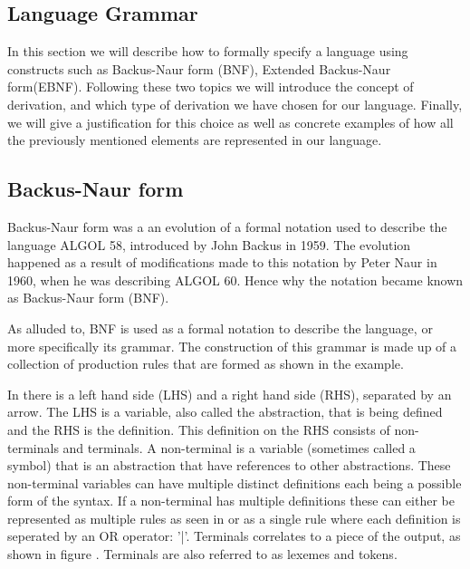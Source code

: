 \subsection{Language Grammar} \label{langGram}

In this section we will describe how to formally specify a language using constructs such as Backus-Naur form (BNF), Extended Backus-Naur form(EBNF).
Following these two topics we will introduce the concept of derivation, and which type of derivation we have chosen for our language. 
Finally, we will give a justification for this choice as well as concrete examples of how all the previously mentioned elements are represented in our language.

\subsection{Backus-Naur form}

Backus-Naur form was a an evolution of a formal notation used to describe the language ALGOL 58, introduced by John Backus in 1959. The evolution happened as a result of modifications
made to this notation by Peter Naur in 1960, when he was describing ALGOL 60. Hence why the notation became known as Backus-Naur form (BNF)\cite{sebesta_concepts_2016}. 

As alluded to, BNF is used as a formal notation to describe the language, or more specifically its grammar. The construction of this grammar is made up of a collection of production rules that are formed as shown in the example.

In  there is a left hand side (LHS) and a right hand side (RHS), separated by an arrow. The LHS is a variable, also called the abstraction, that is being defined and the RHS is the definition.
This definition on the RHS consists of non-terminals and terminals. A non-terminal is a variable (sometimes called a symbol) that is an abstraction that have references to other abstractions. 
These non-terminal variables can have multiple distinct definitions each being a possible form of the syntax. If a non-terminal has multiple definitions these can either be represented as multiple 
rules as seen in  or as a single rule where each definition is seperated by an OR operator: '|'. Terminals correlates to a piece of the output, as shown in figure . 
Terminals are also referred to as lexemes and tokens\cite{sebesta_concepts_2016}. 

